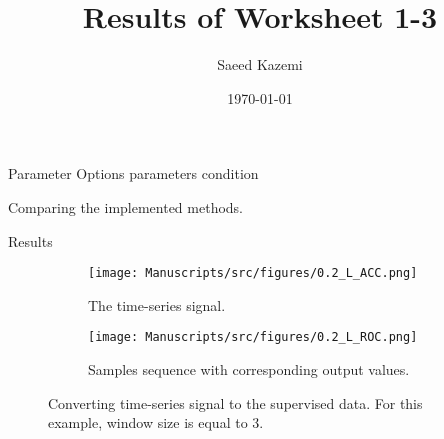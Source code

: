 \documentclass{beamer}
\title{Results of Worksheet 1-3}
\date{\today}
\author{Saeed Kazemi}
\institute{University of New Brunswick}
\begin{document}
    \maketitle

    \begin{frame}{Parameter Options}
        parameters condition
        \begin{table}[H]
        \centering
        \caption{Comparing the implemented methods.}
        \label{tab:parameters condition}
        
        \end{table}
        
    \end{frame}

    \begin{frame}{Results}
        \centering

        \begin{figure}[H]
             \centering
             \begin{subfigure}
                 \centering
                 \texttt{[image: Manuscripts/src/figures/0.2\_L\_ACC.png]}
                 \caption{The time-series signal.}
                 \label{fig:ROC_all}
             \end{subfigure}
             \vfill
             \begin{subfigure}
                 \centering
                 \texttt{[image: Manuscripts/src/figures/0.2\_L\_ROC.png]}
                 \caption{Samples sequence with corresponding output values.}
                 \label{fig:ROC_fcn}
             \end{subfigure} 
                \caption{Converting time-series signal to the supervised data. For this example, window size is equal to 3. }
                \label{fig:ROC}
        \end{figure}
    \end{frame}
\end{document}
